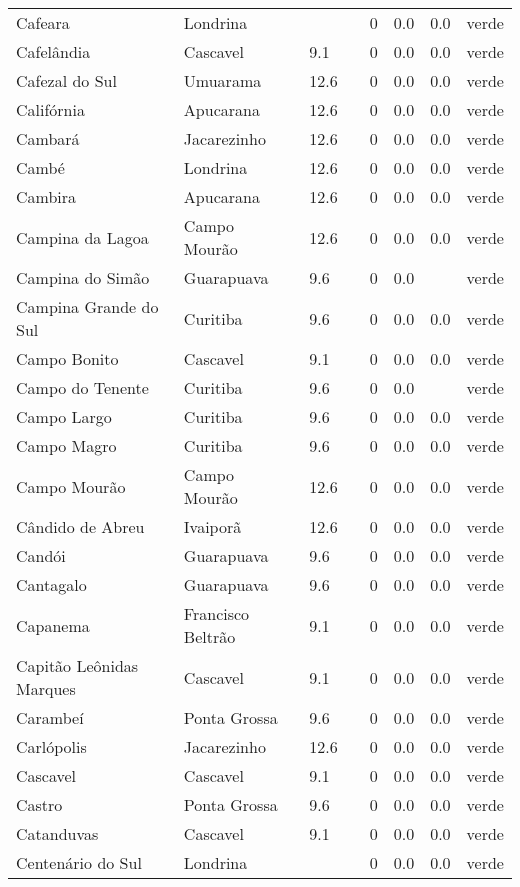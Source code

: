 \begin{longtable}{l|lllllll}
  Cafeara & Londrina &  &  & 0 & 0.0 & 0.0 & verde \\ 
  Cafelândia & Cascavel & 9.1 &  & 0 & 0.0 & 0.0 & verde \\ 
  Cafezal do Sul & Umuarama & 12.6 &  & 0 & 0.0 & 0.0 & verde \\ 
  Califórnia & Apucarana & 12.6 &  & 0 & 0.0 & 0.0 & verde \\ 
  Cambará & Jacarezinho & 12.6 &  & 0 & 0.0 & 0.0 & verde \\ 
  Cambé & Londrina & 12.6 &  & 0 & 0.0 & 0.0 & verde \\ 
  Cambira & Apucarana & 12.6 &  & 0 & 0.0 & 0.0 & verde \\ 
  Campina da Lagoa & Campo Mourão & 12.6 &  & 0 & 0.0 & 0.0 & verde \\ 
  Campina do Simão & Guarapuava & 9.6 &  & 0 & 0.0 &  & verde \\ 
  Campina Grande do Sul & Curitiba & 9.6 &  & 0 & 0.0 & 0.0 & verde \\ 
  Campo Bonito & Cascavel & 9.1 &  & 0 & 0.0 & 0.0 & verde \\ 
  Campo do Tenente & Curitiba & 9.6 &  & 0 & 0.0 &  & verde \\ 
  Campo Largo & Curitiba & 9.6 &  & 0 & 0.0 & 0.0 & verde \\ 
  Campo Magro & Curitiba & 9.6 &  & 0 & 0.0 & 0.0 & verde \\ 
  Campo Mourão & Campo Mourão & 12.6 &  & 0 & 0.0 & 0.0 & verde \\ 
  Cândido de Abreu & Ivaiporã & 12.6 &  & 0 & 0.0 & 0.0 & verde \\ 
  Candói & Guarapuava & 9.6 &  & 0 & 0.0 & 0.0 & verde \\ 
  Cantagalo & Guarapuava & 9.6 &  & 0 & 0.0 & 0.0 & verde \\ 
  Capanema & Francisco Beltrão & 9.1 &  & 0 & 0.0 & 0.0 & verde \\ 
  Capitão Leônidas Marques & Cascavel & 9.1 &  & 0 & 0.0 & 0.0 & verde \\ 
  Carambeí & Ponta Grossa & 9.6 &  & 0 & 0.0 & 0.0 & verde \\ 
  Carlópolis & Jacarezinho & 12.6 &  & 0 & 0.0 & 0.0 & verde \\ 
  Cascavel & Cascavel & 9.1 &  & 0 & 0.0 & 0.0 & verde \\ 
  Castro & Ponta Grossa & 9.6 &  & 0 & 0.0 & 0.0 & verde \\ 
  Catanduvas & Cascavel & 9.1 &  & 0 & 0.0 & 0.0 & verde \\ 
  Centenário do Sul & Londrina &  &  & 0 & 0.0 & 0.0 & verde \\ 

\end{longtable}
